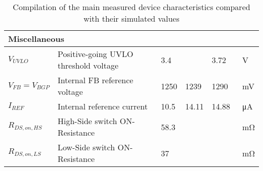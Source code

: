\begin{table}[h!]
\begin{tabular}{|l|l|l|l|l|l|}
    \multicolumn{6}{|l|}{\textbf{Miscellaneous}} \\ \hline
    $V_{UVLO}$  & Positive-going UVLO threshold voltage & 3.4  &   &  3.72 &   \qty{}{\volt}  \\ \hline
    $V_{FB} = V_{BGP}$  & Internal FB reference voltage  & 1250  & 1239  & 1290 &   \qty{}{\milli\volt}  \\ \hline
    $I_{REF}$  & Internal reference current  & 10.5  & 14.11  & 14.88 &   \qty{}{\micro\ampere}  \\ \hline
    $R_{DS,on,HS}$ & High-Side switch ON-Resistance &   58.3 &   &     & \qty{}{\milli\ohm}\\ \hline 
    $R_{DS,on,LS}$ & Low-Side switch ON-Resistance &   37 &   &     & \qty{}{\milli\ohm}\\ \hline 
    \end{tabular}
    \caption{Compilation of the main measured device characteristics compared with their simulated values}
    \label{tab:datasheet}
\end{table}